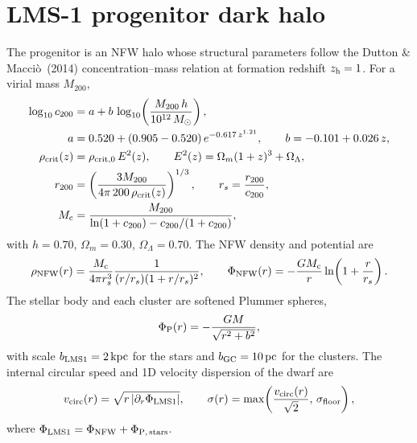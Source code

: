 \documentclass[11pt]{article}
\newcommand{\Msun}{M_\odot}
\newcommand{\kpc}{\,\mathrm{kpc}}
\begin{document}
\section{LMS-1 progenitor dark halo}
The progenitor is an NFW halo whose structural parameters follow the
Dutton \& Macci\`o~(2014) concentration--mass relation at formation redshift
$z_{\rm h}=1$. For a virial mass $M_{200}$,
\begin{align}
\log_{10} c_{200} &= a + b\,\log_{10}\!\left(\frac{M_{200}\,h}{10^{12}\,\Msun}\right),\\
a &= 0.520 + (0.905-0.520)\,e^{-0.617\,z^{1.21}}, \qquad b = -0.101 + 0.026\,z,\\
\rho_{\rm crit}(z) &= \rho_{\rm crit,0}\,E^2(z), \qquad
E^2(z)=\Omega_m(1+z)^3+\Omega_\Lambda,\\
r_{200} &= \left(\frac{3 M_{200}}{4\pi\,200\,\rho_{\rm crit}(z)}\right)^{1/3},
\qquad r_s = \frac{r_{200}}{c_{200}},\\
M_{\rm c} &= \frac{M_{200}}{\ln(1+c_{200}) - c_{200}/(1+c_{200})},
\end{align}
with $h=0.70$, $\Omega_m=0.30$, $\Omega_\Lambda=0.70$. The NFW density and
potential are
\begin{equation}
\rho_{\rm NFW}(r)=\frac{M_{\rm c}}{4\pi r_s^3}\frac{1}{(r/r_s)(1+r/r_s)^2},
\qquad
\Phi_{\rm NFW}(r)=-\frac{G M_{\rm c}}{r}\ln\!\left(1+\frac{r}{r_s}\right).
\end{equation}
The stellar body and each cluster are softened Plummer spheres,
\begin{equation}
\Phi_{\rm P}(r)=-\frac{G M}{\sqrt{r^2+b^2}},
\end{equation}
with scale $b_{\rm LMS1}=2\kpc$ for the stars and $b_{\rm GC}=10\,\mathrm{pc}$
for the clusters. The internal circular speed and 1D velocity dispersion of the
dwarf are
\begin{equation}
v_{\rm circ}(r)=\sqrt{r\left|\partial_r\Phi_{\rm LMS1}\right|},
\qquad
\sigma(r)=\max\!\left(\frac{v_{\rm circ}(r)}{\sqrt2},\,\sigma_{\rm floor}\right),
\end{equation}
where $\Phi_{\rm LMS1}=\Phi_{\rm NFW}+\Phi_{\rm P,\,stars}$.
\end{document}

